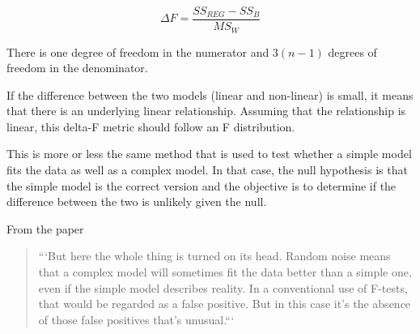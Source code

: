 \documentclass[12pt, a4paper, oneside]{article}\usepackage[]{graphicx}\usepackage[]{color}
\begin{document}
\begin{equation}
\Delta F = \frac{SS_{REG} - SS_B}{MS_W}
\end{equation}

There is one degree of freedom in the numerator and $3(n-1)$ degrees of freedom in the denominator. 

If the difference between the two models (linear and non-linear) is small, it means that there is an underlying linear relationship. Assuming that the relationship is linear, this delta-F metric should follow an F distribution. 

This is more or less the same method that is used to test whether a simple model fits the data as well as a complex model. In that case, the null hypothesis is that the simple model is the correct version and the objective is to determine if the difference between the two is unlikely given the null. 

From the paper

\begin{quotation}
```But here the whole thing is turned on its head. Random noise means that a complex model will sometimes fit the data better than a simple one, even if the simple model describes reality. In a conventional use of F-tests, that would be regarded as a false positive. But in this case it’s the absence of those false positives that’s unusual.```
\end{quotation}
\end{document}
